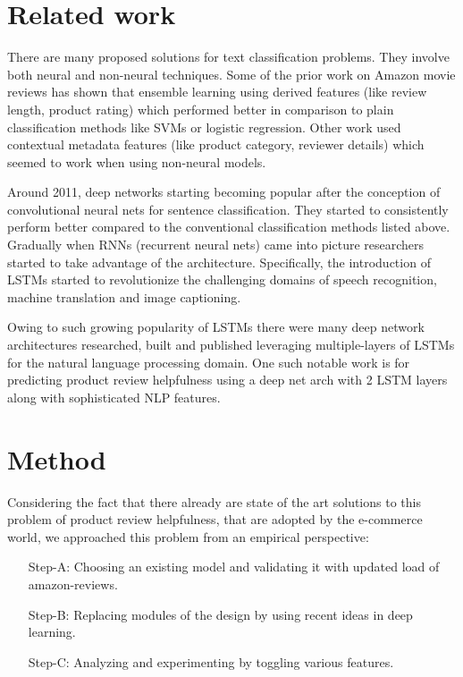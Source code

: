 \documentclass[a4paper,11pt]{article}
\begin{document}

\section{Related work}

There are many proposed solutions for text classification problems. They involve both neural and non-neural techniques. Some of the prior work on Amazon movie reviews has shown that ensemble learning using derived features (like review length, product rating) which performed better in comparison to plain classification methods like SVMs or logistic regression.
Other work used contextual metadata features (like product category, reviewer details) which seemed to work when using non-neural models.

Around 2011, deep networks starting becoming popular after the conception of convolutional neural nets\cite{DBLP:journals/corr/Kim14f} for sentence classification. They started to consistently perform better compared to the conventional classification methods listed above. Gradually when RNNs (recurrent neural nets) came into picture researchers started to take advantage of the architecture. Specifically, the introduction of LSTMs started to revolutionize the challenging domains of speech recognition, machine translation and image captioning.

Owing to such growing popularity of LSTMs there were many deep network architectures researched, built and published leveraging multiple-layers of LSTMs for the natural language processing domain. One such notable work is for predicting product review helpfulness using a deep net arch with 2 LSTM layers along with sophisticated NLP features\cite{wei}. 

\section{Method}

Considering the fact that there already are state of the art solutions to this problem of product review helpfulness, that are adopted by the e-commerce world, we approached this problem from an empirical perspective:
\begin{enumerate}
	\item[Step-A:] Choosing an existing model and validating it with updated load of amazon-reviews.
	\item[Step-B:] Replacing modules of the design by using recent ideas in deep learning.
	\item[Step-C:] Analyzing and experimenting by toggling various features.
\end{enumerate}
\end{document}
